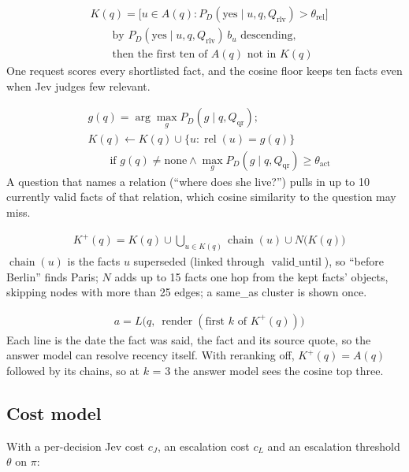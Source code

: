\documentclass[11pt]{article}
\newcommand{\src}[1]{}
\begin{document}
\begin{align}
& K(q) = \bigl[u \in A(q) : P_D(\text{yes} \mid u, q, Q_{\text{rlv}}) > \theta_{\text{rel}}\bigr] \nonumber\\
& \qquad \text{by } P_D(\text{yes} \mid u, q, Q_{\text{rlv}})\, b_u \text{ descending}, \nonumber\\
& \qquad \text{then the first ten of } A(q) \text{ not in } K(q) \label{eq:rerank}
\end{align}
One request scores every shortlisted fact, and the cosine floor keeps ten facts even when Jev judges few relevant.

\begin{align}
& g(q) = \arg\max_{g} P_D(g \mid q, Q_{\text{qr}}); \nonumber\\
& K(q) \leftarrow K(q) \cup \bigl\{u : \operatorname{rel}(u) = g(q)\bigr\} \nonumber\\
& \qquad \text{if } g(q) \neq \text{none} \wedge \max_{g} P_D(g \mid q, Q_{\text{qr}}) \ge \theta_{\text{act}} \label{eq:pull}
\end{align}
A question that names a relation (``where does she live?'') pulls in up to 10\src{src/engram/pipeline/retrieve.py (MAX\_RELATION\_PULL)} currently valid facts of that relation, which cosine similarity to the question may miss.

\begin{align}
& K^{+}(q) = K(q) \cup \textstyle\bigcup_{u \in K(q)} \operatorname{chain}(u) \cup N\bigl(K(q)\bigr) \label{eq:hist}
\end{align}
$\operatorname{chain}(u)$ is the facts $u$ superseded (linked through $\operatorname{valid\_until}$), so ``before Berlin'' finds Paris; $N$ adds up to 15\src{src/engram/pipeline/retrieve.py (MAX\_EXPANDED)} facts one hop from the kept facts' objects, skipping nodes with more than 25\src{src/engram/pipeline/retrieve.py (HUB\_DEGREE)} edges; a same\_as cluster is shown once.

\begin{align}
& a = L\bigl(q,\ \operatorname{render}(\text{first } k \text{ of } K^{+}(q))\bigr) \label{eq:answer}
\end{align}
Each line is the date the fact was said, the fact and its source quote, so the answer model can resolve recency itself. With reranking off, $K^{+}(q) = A(q)$ followed by its chains, so at $k$ = 3 the answer model sees the cosine top three.

\subsection{Cost model}\label{sec:3.4}
With a per-decision Jev cost $c_J$, an escalation cost $c_L$ and an escalation threshold $\theta$ on $\pi$:
\end{document}
